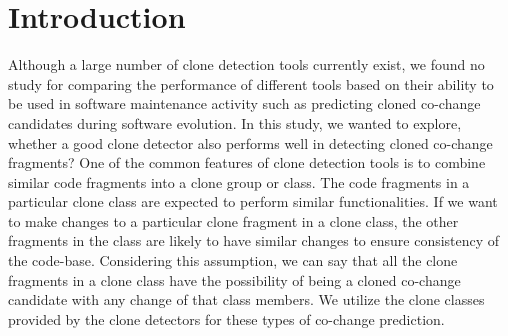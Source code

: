 \documentclass[review]{elsarticle}
\begin{document}
\section{Introduction}
\label{the-introduction}
Although a large number of clone detection tools currently exist, we found no study for comparing the performance of different tools based on their ability to be used in software maintenance activity such as predicting cloned co-change candidates during software evolution. In this study, we wanted to explore, whether a good clone detector also performs well in detecting cloned co-change fragments? %
One of the common features of clone detection tools is to combine similar code fragments into a clone group or class. The code fragments in a particular clone class are expected to perform similar functionalities. If we want to make changes to a particular clone fragment in a clone class, the other fragments in the class are likely to have similar changes to ensure consistency of the code-base. Considering this assumption, we can say that all the clone fragments in a clone class have the possibility of being a cloned co-change candidate with any change of that class members. We utilize the clone classes provided by the clone detectors for these types of co-change prediction.
\end{document}
